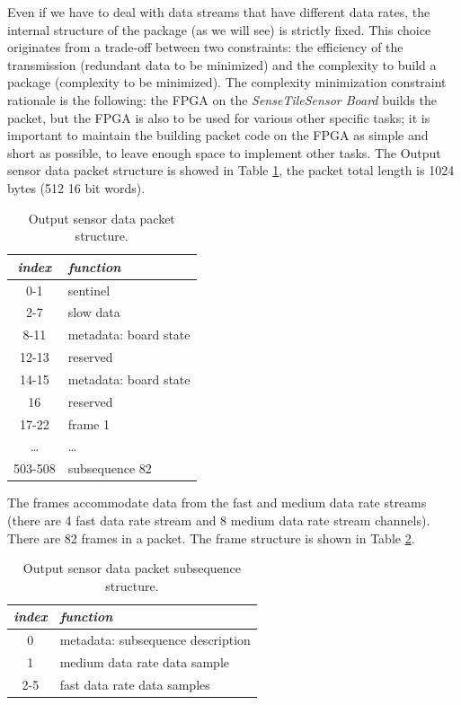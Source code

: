 \documentclass{article} \usepackage{times}
\newcommand{\ST}{\emph{SenseTile}\xspace}
\newcommand{\SB}{\emph{Sensor Board}\xspace}
\newcommand{\STSB}{\ST \SB\xspace}
\begin{document}
Even if we have to deal with data streams that have different data rates, the 
internal structure of the package (as we will see) is strictly fixed. 
This choice originates from a trade-off between two constraints: the efficiency 
of the transmission (redundant data to be minimized) and the complexity to build 
a package (complexity to be minimized).
The complexity minimization constraint rationale is the following: the FPGA 
on the \STSB builds the packet, but the FPGA is also to be used for various 
other specific tasks; it is important to maintain the building packet code on the 
FPGA as simple and short as possible, to leave enough space to implement other 
tasks.
The Output sensor data packet structure is showed in Table 
\ref{tab:data_packet_structure}, the packet total length is 1024 bytes (512 16 
bit words).

\begin{table}[htbp]
\caption{Output sensor data packet structure.}
\label{tab:data_packet_structure}
\begin{center}
\begin{tabular}{|c|l|}\hline
\textbf{\textit{index}} & \textbf{\textit{function}}\\\hline
0-1 & sentinel\\\hline
2-7 & slow data\\\hline
8-11 & metadata: board state\\\hline
12-13 & reserved\\\hline
14-15 & metadata: board state\\\hline
16 & reserved\\\hline
17-22 & frame 1\\\hline
\ldots & \ldots\\\hline
503-508 & subsequence 82\\\hline
\end{tabular}
\end{center}
\end{table}

The frames accommodate data from the fast and medium data rate streams 
(there are 4 fast data rate stream and 8 medium data rate stream channels). 
There are 82 frames in a packet.
The frame structure is shown in Table \ref{tab:subsequence_structure}.

\begin{table}[htbp]
\caption{Output sensor data packet subsequence structure.}
\label{tab:subsequence_structure}
\begin{center}
\begin{tabular}{|c|l|}\hline
\textbf{\textit{index}} & \textbf{\textit{function}}\\\hline
0 & metadata: subsequence description\\\hline
1 & medium data rate data sample\\\hline
2-5 & fast data rate data samples\\\hline
\end{tabular}
\end{center}
\end{table}
\end{document}
